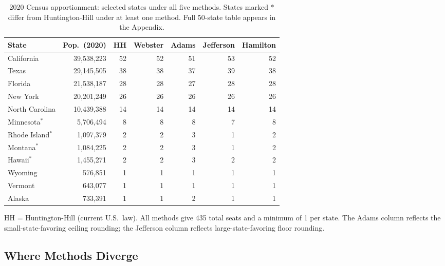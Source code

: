\begin{table}[t]
\centering
\small
\caption{2020 Census apportionment: selected states under all five methods.
  States marked $*$ differ from Huntington-Hill under at least one method.
  Full 50-state table appears in the Appendix.}
\label{tab:2020seats}
\begin{tabular}{lrrrrrr}
\toprule
State & Pop.\ (2020) & HH & Webster & Adams & Jefferson & Hamilton \\
\midrule
California    & 39,538,223 & 52 & 52 & 51 & 53 & 52 \\
Texas         & 29,145,505 & 38 & 38 & 37 & 39 & 38 \\
Florida       & 21,538,187 & 28 & 28 & 27 & 28 & 28 \\
New York      & 20,201,249 & 26 & 26 & 26 & 26 & 26 \\
North Carolina &10,439,388 & 14 & 14 & 14 & 14 & 14 \\
Minnesota$^*$ &  5,706,494 &  8 &  8 &  8 &  7 &  8 \\
Rhode Island$^*$& 1,097,379 & 2 &  2 &  3 &  1 &  2 \\
Montana$^*$   &  1,084,225 &  2 &  2 &  3 &  1 &  2 \\
Hawaii$^*$    &  1,455,271 &  2 &  2 &  3 &  2 &  2 \\
Wyoming       &    576,851 &  1 &  1 &  1 &  1 &  1 \\
Vermont       &    643,077 &  1 &  1 &  1 &  1 &  1 \\
Alaska        &    733,391 &  1 &  1 &  2 &  1 &  1 \\
\bottomrule
\end{tabular}
\begin{tablenotes}
\small
\item HH = Huntington-Hill (current U.S.\ law).
  All methods give 435 total seats and a minimum of 1 per state.
  The Adams column reflects the small-state-favoring ceiling rounding;
  the Jefferson column reflects large-state-favoring floor rounding.
\end{tablenotes}
\end{table}

\subsection{Where Methods Diverge}

